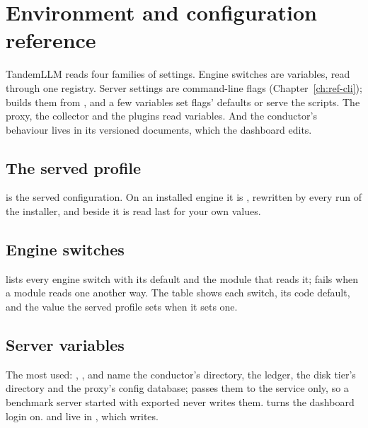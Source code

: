 \chapter{Environment and configuration reference}\label{ch:ref-env}

TandemLLM reads four families of settings. Engine switches are  variables, read through one registry. Server settings are command-line flags (Chapter~\ref{ch:ref-cli});  builds them from , and a few  variables set flags' defaults or serve the scripts. The proxy, the collector and the plugins read  variables. And the conductor's behaviour lives in its versioned documents, which the dashboard edits.

\section{The served profile}

 is the served configuration. On an installed engine it is , rewritten by every run of the installer, and  beside it is read last for your own values.



\section{Engine switches}

 lists every engine switch with its default and the module that reads it;  fails when a module reads one another way. The table shows each switch, its code default, and the value the served profile sets when it sets one.



\section{Server variables}



The most used: , ,  and  name the conductor's directory, the ledger, the disk tier's directory and the proxy's config database;  passes them to the service only, so a benchmark server started with  exported never writes them.  turns the dashboard login on.  and  live in , which  writes.


